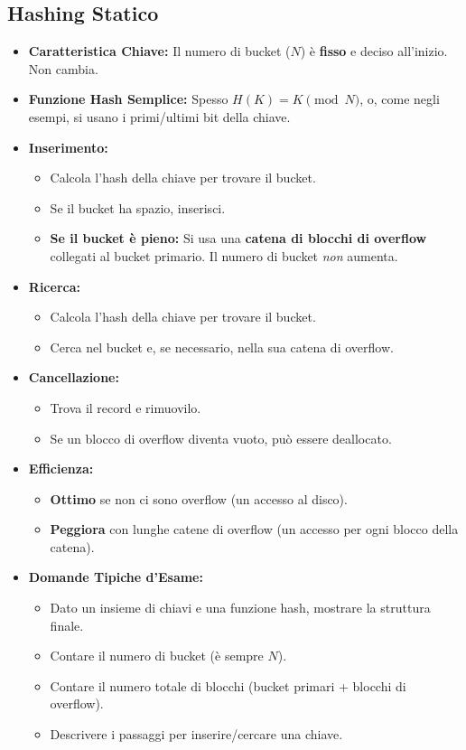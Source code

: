 \subsection{Hashing Statico}
\begin{itemize}
    \item \textbf{Caratteristica Chiave:} Il numero di bucket ($N$) è \textbf{fisso} e deciso all'inizio. Non cambia.
    \item \textbf{Funzione Hash Semplice:} Spesso $H(K) = K \pmod N$, o, come negli esempi, si usano i primi/ultimi bit della chiave.
    \item \textbf{Inserimento:}
    \begin{itemize}
        \item Calcola l'hash della chiave per trovare il bucket.
        \item Se il bucket ha spazio, inserisci.
        \item \textbf{Se il bucket è pieno:} Si usa una \textbf{catena di blocchi di overflow} collegati al bucket primario. Il numero di bucket \textit{non} aumenta.
    \end{itemize}
    \item \textbf{Ricerca:}
    \begin{itemize}
        \item Calcola l'hash della chiave per trovare il bucket.
        \item Cerca nel bucket e, se necessario, nella sua catena di overflow.
    \end{itemize}
    \item \textbf{Cancellazione:}
    \begin{itemize}
        \item Trova il record e rimuovilo.
        \item Se un blocco di overflow diventa vuoto, può essere deallocato.
    \end{itemize}
    \item \textbf{Efficienza:}
    \begin{itemize}
        \item \textbf{Ottimo} se non ci sono overflow (un accesso al disco).
        \item \textbf{Peggiora} con lunghe catene di overflow (un accesso per ogni blocco della catena).
    \end{itemize}
    \item \textbf{Domande Tipiche d'Esame:}
    \begin{itemize}
        \item Dato un insieme di chiavi e una funzione hash, mostrare la struttura finale.
        \item Contare il numero di bucket (è sempre $N$).
        \item Contare il numero totale di blocchi (bucket primari + blocchi di overflow).
        \item Descrivere i passaggi per inserire/cercare una chiave.
    \end{itemize}
\end{itemize}

